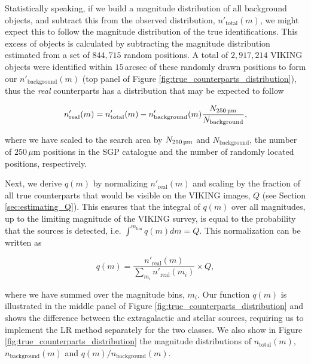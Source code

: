 Statistically speaking, if we build a magnitude distribution of all background objects, and subtract this from the observed distribution, $n'_{\textrm{total}}(m)$, we might expect this to follow the magnitude distribution of the true identifications. This excess of objects is calculated by subtracting the magnitude distribution estimated from a set of $844,715$ random positions. A total of $2,917,214$ VIKING objects were identified within $15\,$arcsec of these randomly drawn positions to form our $n'_{\textrm{background}}(m)$ (top panel of Figure \ref{fig:true_counterparts_distribution}), thus the \textit{real} counterparts has a distribution that may be expected to follow

\begin{equation}
    n'_{\textrm{real}}(m) = n'_{\textrm{total}}(m) - n'_{\textrm{background}}(m) \frac{N_{\textrm{250\,\micron}}}{N_{\textrm{background}}},
\label{eq:real_distribution}
\end{equation}

\noindent where we have scaled to the search area by $N_{\textrm{250\,\micron}}$ and $N_{\textrm{background}}$, the number of $250\,\mu$m positions in the SGP catalogue and the number of randomly located positions, respectively.

Next, we derive $q(m)$ by normalizing $n'_{\textrm{real}}(m)$ and scaling by the fraction of all true counterparts that would be visible on the VIKING images, $Q$ (see Section \ref{sec:estimating_Q}). This ensures that the integral of $q(m)$ over all magnitudes, up to the limiting magnitude of the VIKING survey, is equal to the probability that the sources is detected, i.e. $\int^{m_{\textrm{lim}}} q(m)dm = Q$. This normalization can be written as

\begin{equation}
\label{eq:true_counterparts_distribution}
    q(m) = \frac{n'_{\textrm{real}}(m)}{\sum_{m_i}n'_{\textrm{real}}(m_i)}\times Q,
\end{equation}

\noindent where we have summed over the magnitude bins, $m_i$. Our function $q(m)$ is illustrated in the middle panel of Figure \ref{fig:true_counterparts_distribution} and shows the difference between the extragalactic and stellar sources, requiring us to implement the LR method separately for the two classes. We also show in Figure \ref{fig:true_counterparts_distribution} the magnitude distributions of $n_{\textrm{total}}(m)$, $n_{\textrm{background}}(m)$ and $q(m)/n_{\textrm{background}}(m)$. 

